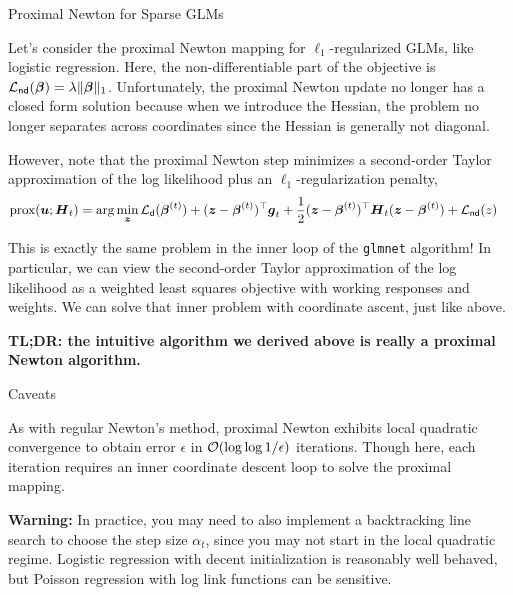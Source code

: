 \documentclass[aspectratio=169]{beamer}
\begin{document}
\begin{frame}[t,allowframebreaks]{Proximal Newton for Sparse
GLMs}\label{proximal-newton-for-sparse-glms}

Let's consider the proximal Newton mapping for \(\ell_1\)-regularized
GLMs, like logistic regression. Here, the non-differentiable part of the
objective is \(\mathcal{L}_{\mathsf{nd}}(\boldsymbol{\beta}) = \lambda \|\boldsymbol{\beta}\|_1\).
Unfortunately, the proximal Newton update no longer has a closed form
solution because when we introduce the Hessian, the problem no longer
separates across coordinates since the Hessian is generally not
diagonal.

However, note that the proximal Newton step minimizes a second-order
Taylor approximation of the log likelihood plus an
\(\ell_1\)-regularization penalty, \begin{align*}
\mathrm{prox}(\boldsymbol{u}; \boldsymbol{H}_t) 
&= \arg \min_{\boldsymbol{z}} \mathcal{L}_{\mathsf{d}}(\boldsymbol{\beta}^{(t)}) + (\boldsymbol{z} - \boldsymbol{\beta}^{(t)})^\top \boldsymbol{g}_t + \frac{1}{2} (\boldsymbol{z} - \boldsymbol{\beta}^{(t)})^\top \boldsymbol{H}_t (\boldsymbol{z} - \boldsymbol{\beta}^{(t)}) + \mathcal{L}_{\mathsf{nd}}(z)
\end{align*}

This is exactly the same problem in the inner loop of the
\texttt{glmnet} algorithm! In particular, we can view the second-order
Taylor approximation of the log likelihood as a weighted least squares
objective with working responses and weights. We can solve that inner
problem with coordinate ascent, just like above.

\textbf{TL;DR: the intuitive algorithm we derived above is really a
proximal Newton algorithm.}
\end{frame}

\begin{frame}[t,allowframebreaks]{Caveats}\label{caveats}

As with regular Newton's method, proximal Newton exhibits local
quadratic convergence to obtain error \(\epsilon\) in
\(\mathcal{O}(\log \log 1/\epsilon)\) iterations. Though here, each iteration
requires an inner coordinate descent loop to solve the proximal mapping.

\textbf{Warning:} In practice, you may need to also
implement a backtracking line search to choose the step size
\(\alpha_t\), since you may not start in the local quadratic regime.
Logistic regression with decent initialization is reasonably well
behaved, but Poisson regression with log link functions can be
sensitive. 
\end{frame}
\end{document}

